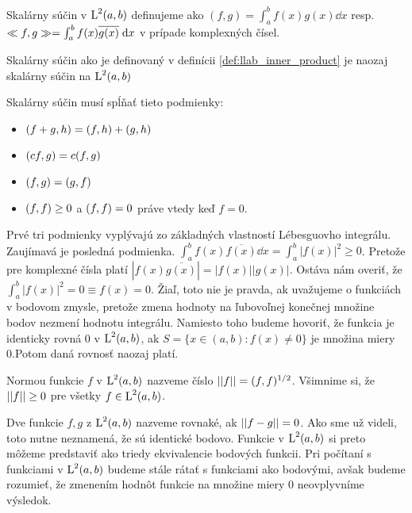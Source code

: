 \begin{definicia}
    Skalárny súčin v $\mbox{L}^2(a,b)$ definujeme ako
    $(f,g) = \int_a^b f(x) g(x) \dd x$ resp. 
    $\ll f,g \gg = \int_a^b f(x) \overline{g(x)} \; \mathrm{d} x$ v prípade
    komplexných čísel.
    \label{def:llab_inner_product}
\end{definicia}
\begin{lema}
    Skalárny súčin ako je definovaný v definícii
    \ref{def:llab_inner_product}
    je naozaj skalárny súčin na $\mbox{L}^2(a,b)$
\end{lema}
\begin{dokaz}
Skalárny súčin musí spĺňať tieto podmienky:
\begin{itemize}
    \item $( f+g,h ) = ( f,h ) + ( g,h )$
    \item $( cf,g ) = c ( f,g )$
    \item $( f,g ) = ( g,f )$
    \item $( f,f ) \ge 0$ a $( f,f )=0$ práve vtedy keď $f=0$.
\end{itemize}
Prvé tri podmienky vyplývajú zo základných vlastností Lébesguovho
integrálu. Zaujímavá je posledná podmienka.
$\int_a^b f(x) \overline{f(x)} \dd x = \int_a^b |f(x)|^2 \ge 0$.
Pretože pre komplexné čísla platí $|f(x)\overline{g(x)}|=|f(x)||g(x)|$.
Ostáva nám overiť, že $\int_a^b |f(x)|^2 = 0 \equiv f(x)=0$.
Žiaľ, toto nie je pravda, ak uvažujeme o funkciách v bodovom zmysle,
pretože zmena hodnoty na ľubovoľnej konečnej množine bodov nezmení
hodnotu integrálu. Namiesto toho budeme hovoriť, že
funkcia je identicky rovná 0 v $\mbox{L}^2(a,b)$, ak $S = \{x\in(a,b):
f(x)\not=0\}$ je množina miery 0.Potom daná rovnosť naozaj platí.
\end{dokaz}

\begin{definicia}
    Normou funkcie $f$ v $\mbox{L}^2(a,b)$ nazveme číslo
    $||f|| = ( f,f )^{1/2}$.
    Všimnime si, že $||f||\ge0$ pre všetky $f\in \mbox{L}^2(a,b)$.
\end{definicia}

\begin{definicia}
    Dve funkcie $f,g$ z $\mbox{L}^2(a,b)$ nazveme rovnaké, ak
    $||f-g||=0$. Ako sme už videli, toto nutne neznamená, že sú
    identické bodovo. Funkcie v $\mbox{L}^2(a,b)$ si preto môžeme predstaviť ako
    triedy ekvivalencie bodových funkcii. Pri počítaní s funkciami v
    $\mbox{L}^2(a,b)$ budeme stále rátať s funkciami ako bodovými, avšak budeme
    rozumieť, že zmenením hodnôt funkcie na množine miery 0
    neovplyvníme výsledok.
\end{definicia}

